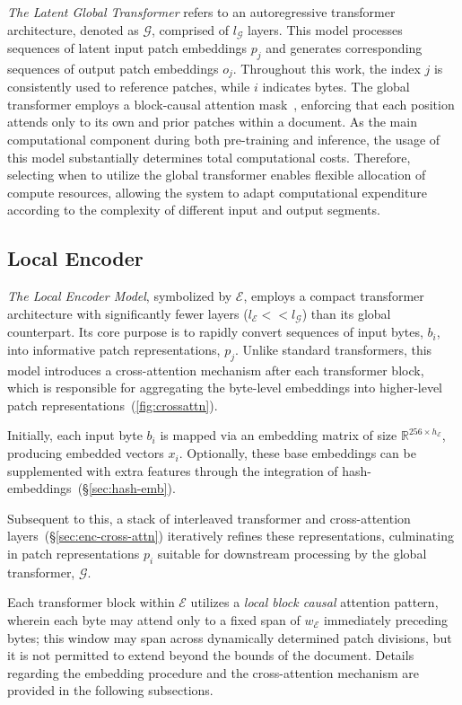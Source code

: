\textit{The Latent Global Transformer} refers to an autoregressive transformer architecture, denoted as $\mathcal{G}$, comprised of $l_{\mathcal{G}}$ layers. This model processes sequences of latent input patch embeddings $p_j$ and generates corresponding sequences of output patch embeddings $o_j$. Throughout this work, the index $j$ is consistently used to reference patches, while $i$ indicates bytes. The global transformer employs a block-causal attention mask~\citep{dubey2024llama}, enforcing that each position attends only to its own and prior patches within a document. As the main computational component during both pre-training and inference, the usage of this model substantially determines total computational costs. Therefore, selecting when to utilize the global transformer enables flexible allocation of compute resources, allowing the system to adapt computational expenditure according to the complexity of different input and output segments.

\subsection{Local Encoder}
\label{section:local}

\textit{The Local Encoder Model}, symbolized by $\mathcal{E}$, employs a compact transformer architecture with significantly fewer layers ($l_{\mathcal{E}} << l_{\mathcal{G}}$) than its global counterpart. Its core purpose is to rapidly convert sequences of input bytes, $b_i$, into informative patch representations, $p_j$. Unlike standard transformers, this model introduces a cross-attention mechanism after each transformer block, which is responsible for aggregating the byte-level embeddings into higher-level patch representations~(\autoref{fig:crossattn}).

Initially, each input byte $b_i$ is mapped via an embedding matrix of size $\mathbb{R}^{256 \times h_{\mathcal{E}}}$, producing embedded vectors $x_i$. Optionally, these base embeddings can be supplemented with extra features through the integration of hash-embeddings~(\S\ref{sec:hash-emb}).

Subsequent to this, a stack of interleaved transformer and cross-attention layers~(\S\ref{sec:enc-cross-attn}) iteratively refines these representations, culminating in patch representations $p_i$ suitable for downstream processing by the global transformer, $\mathcal{G}$.

Each transformer block within $\mathcal{E}$ utilizes a \textit{local block causal} attention pattern, wherein each byte may attend only to a fixed span of $w_{\mathcal{E}}$ immediately preceding bytes; this window may span across dynamically determined patch divisions, but it is not permitted to extend beyond the bounds of the document. Details regarding the embedding procedure and the cross-attention mechanism are provided in the following subsections.


